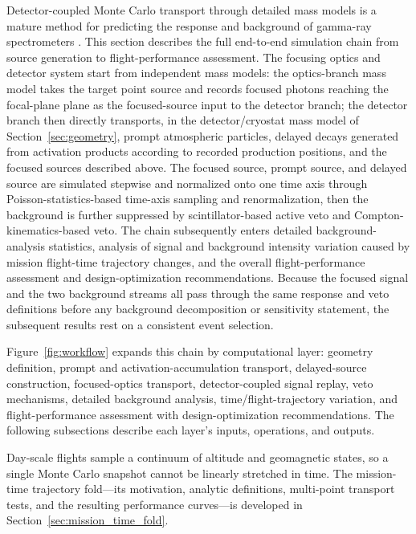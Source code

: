 \documentclass[11pt]{article}
\begin{document}
Detector-coupled Monte Carlo transport through detailed mass models is a mature method for predicting the response and background of gamma-ray spectrometers \cite{Sturner2003}. This section describes the full end-to-end simulation chain from source generation to flight-performance assessment. The focusing optics and detector system start from independent mass models: the optics-branch mass model takes the target point source and records focused photons reaching the focal-plane plane as the focused-source input to the detector branch; the detector branch then directly transports, in the detector/cryostat mass model of Section~\ref{sec:geometry}, prompt atmospheric particles, delayed decays generated from activation products according to recorded production positions, and the focused sources described above. The focused source, prompt source, and delayed source are simulated stepwise and normalized onto one time axis through Poisson-statistics-based time-axis sampling and renormalization, then the background is further suppressed by scintillator-based active veto and Compton-kinematics-based veto. The chain subsequently enters detailed background-analysis statistics, analysis of signal and background intensity variation caused by mission flight-time trajectory changes, and the overall flight-performance assessment and design-optimization recommendations. Because the focused signal and the two background streams all pass through the same response and veto definitions before any background decomposition or sensitivity statement, the subsequent results rest on a consistent event selection.

Figure~\ref{fig:workflow} expands this chain by computational layer: geometry definition, prompt and activation-accumulation transport, delayed-source construction, focused-optics transport, detector-coupled signal replay, veto mechanisms, detailed background analysis, time/flight-trajectory variation, and flight-performance assessment with design-optimization recommendations. The following subsections describe each layer's inputs, operations, and outputs.

Day-scale flights sample a continuum of altitude and geomagnetic states, so a single Monte Carlo snapshot cannot be linearly stretched in time. The mission-time trajectory fold---its motivation, analytic definitions, multi-point transport tests, and the resulting performance curves---is developed in Section~\ref{sec:mission_time_fold}.
\end{document}
